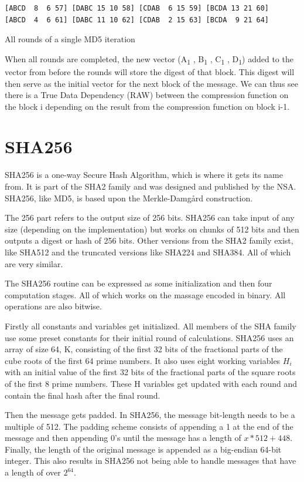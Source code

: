 \documentclass[a4paper, openany]{book}
\begin{document}
\begin{abstact}
\begin{table}[H]
\begin{verbatim}
[ABCD  8  6 57] [DABC 15 10 58] [CDAB  6 15 59] [BCDA 13 21 60]
[ABCD  4  6 61] [DABC 11 10 62] [CDAB  2 15 63] [BCDA  9 21 64]
\end{verbatim}
\caption{All rounds of a single MD5 iteration}
\label{fig:MD5Rounds}
\end{table}
When all rounds are completed, the new vector (A\textsubscript{1} , B\textsubscript{1} , C\textsubscript{1} , D\textsubscript{1}) added to the vector from before the rounds will store the digest of that block. This digest will then serve as the initial vector for the next block of the message. We can thus see there is a True Data Dependency (RAW) between the compression function on the block i depending on the result from the compression function on block i-1.
\section{SHA256}
\label{SHAalg}
SHA256 is a one-way Secure Hash Algorithm, which is where it gets its name from.
It is part of the SHA2 family and was designed and published by the NSA.
SHA256, like MD5, is based upon the Merkle-Damgård construction.

The 256 part refers to the output size of 256 bits.
SHA256 can take input of any size (depending on the implementation) but works
on chunks of 512 bits and then outputs a digest or hash of 256 bits.
Other versions from the SHA2 family exist, like SHA512 and the truncated
versions like SHA224 and SHA384. All of which are very similar.

The SHA256 routine can be expressed as some initialization and then four computation stages.
All of which works on the massage encoded in binary. All operations are also bitwise.

Firstly all constants and variables get initialized. All members of the SHA family use some preset constants for their initial round of calculations.
SHA256 uses an array of size 64, K, consisting of the first 32 bits of the fractional parts of the cube roots of the first 64 prime numbers.
It also uses eight working variables \(H_i\) with an initial value of the first 32 bits of the fractional parts of the square roots of the first 8 prime numbers.
These H variables get updated with each round and contain the final hash after the final round.

Then the message gets padded. In SHA256, the message bit-length needs to be a multiple of 512.
The padding scheme consists of appending a 1 at the end of the message and then appending 0's until the message has a length of \(x*512+448\).
Finally, the length of the original message is appended as a big-endian 64-bit integer.
This also results in SHA256 not being able to handle messages that have a length of over \(2^{64}\).


\end{abstact}
\end{document}
